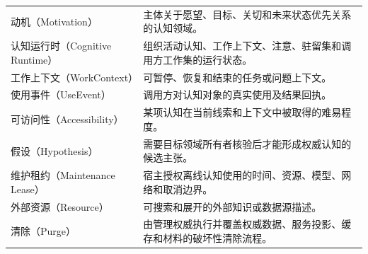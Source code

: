 \begin{longtable}{>{\raggedright\arraybackslash}p{4.7cm}>{\raggedright\arraybackslash}p{9.1cm}}
动机（Motivation） & 主体关于愿望、目标、关切和未来状态优先关系的认知领域。\\
认知运行时（Cognitive Runtime） & 组织活动认知、工作上下文、注意、驻留集和调用方工作集的运行状态。\\
工作上下文（WorkContext） & 可暂停、恢复和结束的任务或问题上下文。\\
使用事件（UseEvent） & 调用方对认知对象的真实使用及结果回执。\\
可访问性（Accessibility） & 某项认知在当前线索和上下文中被取得的难易程度。\\
假设（Hypothesis） & 需要目标领域所有者核验后才能形成权威认知的候选主张。\\
维护租约（Maintenance Lease） & 宿主授权离线认知使用的时间、资源、模型、网络和取消边界。\\
外部资源（Resource） & 可搜索和展开的外部知识或数据源描述。\\
清除（Purge） & 由管理权威执行并覆盖权威数据、服务投影、缓存和材料的破坏性清除流程。\\
\bottomrule
\end{longtable}
